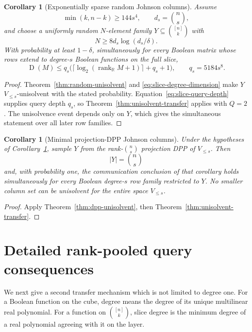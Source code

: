 \documentclass[11pt]{article}
\newtheorem{corollary}[theorem]{Corollary}
\theoremstyle{definition}
\theoremstyle{remark}
\newcommand{\R}{\mathbb R}
\newcommand{\1}{\mathbf 1}
\newcommand{\rank}{\operatorname{rank}}
\newcommand{\Dcc}{\operatorname{D}}
\begin{document}
\begin{corollary}[Exponentially sparse random Johnson columns]
\label{cor:sparse-random-johnson}
Assume
\[
 \min(k,n-k)\ge144s^4,
 \qquad d_s=\binom ns,
\]
and choose a uniformly random $N$-element family
$Y\subseteq\binom{[n]}k$ with
\[
 N\ge8d_s\log(d_s/\delta).
\]
With probability at least $1-\delta$, simultaneously for every Boolean
matrix whose rows extend to degree-$s$ Boolean functions on the full slice,
\[
 \Dcc(M)\le
 q_s\bigl(\lceil\log_2(\rank_{\R}M+1)\rceil+q_s+1\bigr),
 \qquad q_s=5184s^8.
\]
\end{corollary}

\begin{proof}
Theorem~\ref{thm:random-unisolvent} and
\eqref{eq:slice-degree-dimension} make $Y$ $V_{\le s}$-unisolvent with the
stated probability.  Equation~\eqref{eq:slice-query-depth} supplies query
depth $q_s$, so Theorem~\ref{thm:unisolvent-transfer} applies with $Q=2$.
The unisolvence event depends only on $Y$, which gives the simultaneous
statement over all later row families.
\end{proof}

\begin{corollary}[Minimal projection-DPP Johnson columns]
\label{cor:dpp-johnson}
Under the hypotheses of Corollary~\ref{cor:sparse-random-johnson}, sample
$Y$ from the rank-$\binom ns$ projection DPP of $V_{\le s}$.  Then
\[
 |Y|=\binom ns
\]
and, with probability one, the communication conclusion of that corollary
holds simultaneously for every Boolean degree-$s$ row family restricted to
$Y$.  No smaller column set can be unisolvent for the entire space
$V_{\le s}$.
\end{corollary}

\begin{proof}
Apply Theorem~\ref{thm:dpp-unisolvent}, then
Theorem~\ref{thm:unisolvent-transfer}.
\end{proof}

\section{Detailed rank-pooled query consequences}
\label{sec:low-degree-slice}

We next give a second transfer mechanism which is not limited to degree one.
For a Boolean function on the cube, degree means the degree of its unique
multilinear real polynomial.  For a function on $\binom{[n]}k$, slice degree
is the minimum degree of a real polynomial agreeing with it on the layer.
\end{document}
